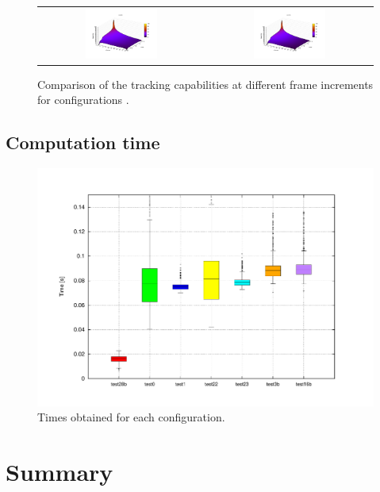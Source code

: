 \begin{figure}[h!]
\begin{tabular}{cc}
\includegraphics[width=0.45\textwidth,trim=50 40 80 60,clip]{recall_vs_delta_frames_vs_step_test28b}\label{fig:cp04_recall_vs_delta_frames_vs_step_test28b} &
\includegraphics[width=0.45\textwidth,trim=50 40 80 60,clip]{recall_vs_delta_frames_vs_step_test16b}\label{fig:cp04_recall_vs_delta_frames_vs_step_test16b}
\end{tabular}
\caption{Comparison of the tracking capabilities at different frame increments for configurations .}\label{fig:cp04_recall_vs_delta_frames_vs_step}
\end{figure}

\subsection{Computation time}\label{ch:chapter04_02_04}

\begin{figure}[h!]
\centering
\includegraphics[trim=50 40 80 60,clip]{times_average}
\caption{Times obtained for each configuration.}\label{fig:cp04_times_average}
\end{figure}



\section{Summary}\label{ch:chapter04_07}

